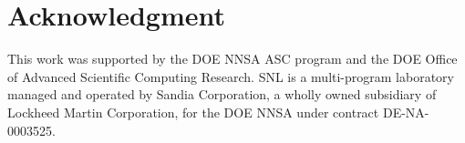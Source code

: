 
\section*{Acknowledgment}
\parindent=0pt
This work was supported by the \gls{DOE} \gls{NNSA} \gls{ASC}
program and the \gls{DOE} Office of Advanced Scientific Computing Research. 
\gls{SNL} is a multi-program laboratory managed and operated by
Sandia Corporation, a wholly owned subsidiary of Lockheed Martin
Corporation, for the \gls{DOE} \gls{NNSA} under contract DE-NA-0003525.


 
